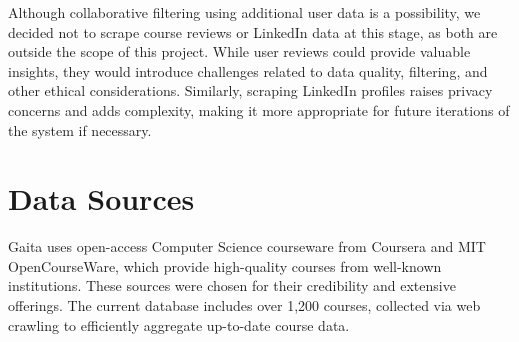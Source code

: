 Although collaborative filtering using additional user data is a possibility, we decided not to scrape course reviews or LinkedIn data at this stage, as both are outside the scope of this project. While user reviews could provide valuable insights, they would introduce challenges related to data quality, filtering, and other ethical considerations. Similarly, scraping LinkedIn profiles raises privacy concerns and adds complexity, making it more appropriate for future iterations of the system if necessary.

\section{Data Sources}

Gaita uses open-access Computer Science courseware from Coursera and MIT OpenCourseWare, which provide high-quality courses from well-known institutions. These sources were chosen for their credibility and extensive offerings. The current database includes over 1,200 courses, collected via web crawling to efficiently aggregate up-to-date course data. 

